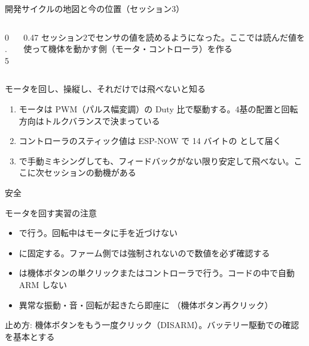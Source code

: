 
\begin{frame}{開発サイクルの地図と今の位置（セッション3）}
  \begin{columns}[c]
    \begin{column}{0.5\textwidth}
      \centering
    \end{column}
    \begin{column}{0.47\textwidth}
      \small
      セッション2でセンサの値を読めるようになった。ここでは読んだ値を使って機体を動かす側（モータ・コントローラ）を作る
    \end{column}
  \end{columns}
\end{frame}

\begin{frame}{モータを回し、操縦し、それだけでは飛べないと知る}
  \begin{enumerate}
    \item モータは PWM（パルス幅変調）の Duty 比で駆動する。4基の配置と回転方向はトルクバランスで決まっている
    \item コントローラのスティック値は ESP-NOW で 14 バイトの  として届く
    \item {} で手動ミキシングしても、フィードバックがない限り安定して飛べない。ここに次セッションの動機がある
  \end{enumerate}
\end{frame}

\begin{frame}{安全}
  \begin{alertblock}{モータを回す実習の注意}
    \begin{itemize}\small\setlength{\itemsep}{2pt}
      \item {}で行う。回転中はモータに手を近づけない
      \item {}に固定する。ファーム側では強制されないので数値を必ず確認する
      \item {} は機体ボタンの単クリックまたはコントローラで行う。コードの中で自動 ARM しない
      \item 異常な振動・音・回転が起きたら即座に （機体ボタン再クリック）
    \end{itemize}
  \end{alertblock}

  \vspace{0.5em}

  {\small 止め方: 機体ボタンをもう一度クリック（DISARM）。バッテリー駆動での確認を基本とする}
\end{frame}

